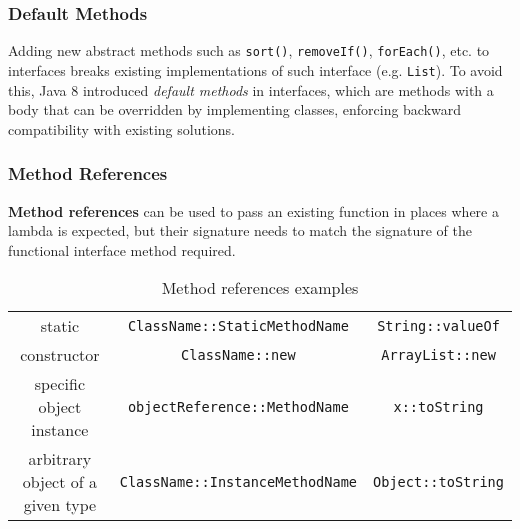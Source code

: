 \subsubsection{Default Methods}
Adding new abstract methods such as \lstinline|sort()|, \lstinline|removeIf()|, \lstinline|forEach()|, etc. to interfaces breaks existing implementations of such interface (e.g. \lstinline|List|).
To avoid this, Java 8 introduced \textit{default methods} in interfaces, which are methods with a body that can be overridden by implementing classes,
enforcing backward compatibility with existing solutions.

\subsubsection{Method References}
\textbf{Method references} can be used to pass an existing
function in places where a lambda is expected,
but their signature needs to
match the signature of the functional interface method required.
\begin{table}[htbp]
   \centering
   \begin{tabular}{|c|c|c|}
      \hline
      static  & \lstinline|ClassName::StaticMethodName| & \lstinline|String::valueOf|\\
      constructor &  \lstinline|ClassName::new| & \lstinline|ArrayList::new|\\
      specific object instance & \lstinline|objectReference::MethodName| & \lstinline|x::toString|\\
      arbitrary object of a given type & \lstinline|ClassName::InstanceMethodName| & \lstinline|Object::toString|\\
      \hline
   \end{tabular}
   \caption{Method references examples}
   \label{tab:method_references}
\end{table}